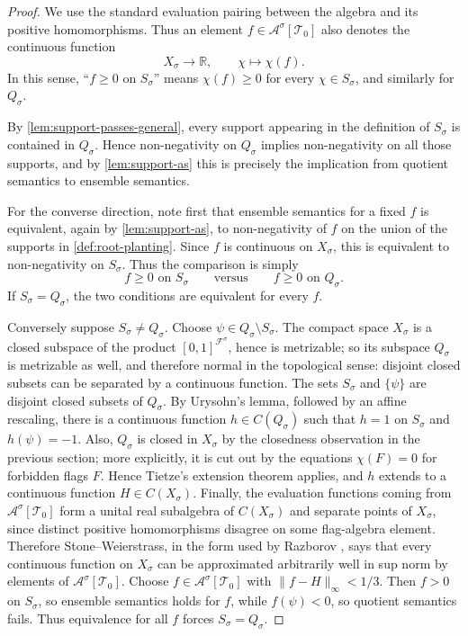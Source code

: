 \documentclass[11pt]{article}
\theoremstyle{definition}
\newcommand{\R}{\mathbb{R}}
\newcommand{\A}{\mathcal{A}}
\newcommand{\F}{\mathcal{F}}
\newcommand{\T}{\mathcal{T}}
\begin{document}
\begin{proof}
We use the standard evaluation pairing between the algebra and its positive
homomorphisms.  Thus an element $f\in\A^\sigma[\T_0]$ also denotes the continuous
function
\[
  X_\sigma\longrightarrow\R,\qquad \chi\longmapsto \chi(f).
\]
In this sense, ``$f\ge0$ on $S_\sigma$'' means $\chi(f)\ge0$ for every
$\chi\in S_\sigma$, and similarly for $Q_\sigma$.

By \cref{lem:support-passes-general}, every support appearing in the definition
of $S_\sigma$ is contained in $Q_\sigma$.  Hence non-negativity on $Q_\sigma$
implies non-negativity on all those supports, and by \cref{lem:support-as} this
is precisely the implication from quotient semantics to ensemble semantics.

For the converse direction, note first that ensemble semantics for a fixed $f$
is equivalent, again by \cref{lem:support-as}, to non-negativity of $f$ on the
union of the supports in \cref{def:root-planting}.  Since $f$ is continuous on
$X_\sigma$, this is equivalent to non-negativity on $S_\sigma$.
Thus the comparison is simply
\[
  f\ge0\text{ on }S_\sigma
  \qquad\text{versus}\qquad
  f\ge0\text{ on }Q_\sigma.
\]
If $S_\sigma=Q_\sigma$, the two conditions are equivalent for every $f$.

Conversely suppose $S_\sigma\ne Q_\sigma$.  Choose
$\psi\in Q_\sigma\setminus S_\sigma$.  The compact space $X_\sigma$ is a closed subspace of the product
$[0,1]^{\F^\sigma}$, hence is metrizable; so its subspace $Q_\sigma$ is metrizable as
well, and therefore normal in the topological sense: disjoint closed subsets can be
separated by a continuous function.  The sets
$S_\sigma$ and $\{\psi\}$ are disjoint closed subsets of $Q_\sigma$.
By Urysohn's lemma, followed by an affine rescaling, there is a continuous function
$h\in C(Q_\sigma)$ such that $h=1$ on $S_\sigma$ and $h(\psi)=-1$.
Also, $Q_\sigma$ is closed in $X_\sigma$ by the closedness observation in the previous
section; more explicitly, it is cut out by the equations $\chi(F)=0$ for forbidden flags
$F$.  Hence Tietze's extension theorem applies, and
$h$ extends to a continuous function $H\in C(X_\sigma)$.  Finally, the evaluation
functions coming from $\A^\sigma[\T_0]$ form a unital real subalgebra of
$C(X_\sigma)$ and separate points of $X_\sigma$, since distinct positive homomorphisms
disagree on some flag-algebra element.  Therefore Stone--Weierstrass, in the form used
by Razborov \cite[Proposition 3.7]{Razborov2007}, says that every continuous function on
$X_\sigma$ can be approximated arbitrarily well in sup norm by elements of
$\A^\sigma[\T_0]$.  Choose
$f\in\A^\sigma[\T_0]$ with $\|f-H\|_\infty<1/3$.  Then $f>0$ on
$S_\sigma$, so ensemble semantics holds for $f$, while $f(\psi)<0$, so quotient
semantics fails.  Thus equivalence for all $f$ forces $S_\sigma=Q_\sigma$.
\end{proof}
\end{document}
